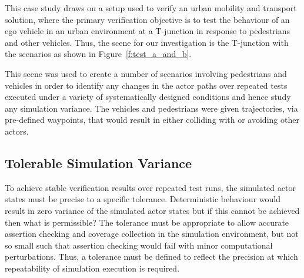\documentclass[letterpaper, 10 pt, journal, twoside]{IEEEtran}
\begin{document}
This case study draws on a setup used to verify an urban mobility and transport solution, where the primary verification objective is to test the behaviour of an ego vehicle in an urban environment at a T-junction in response to pedestrians and other vehicles.
%
Thus, the scene for our investigation is the T-junction with the scenarios as shown in Figure~\ref{f:test_a_and_b}.

This scene was used to create a number of scenarios involving pedestrians and vehicles in order to identify any changes in the actor paths over repeated tests executed under a variety of systematically designed conditions and hence study any simulation variance.
%
The vehicles and pedestrians were given trajectories, via pre-defined waypoints, that would result in either colliding with or avoiding other actors.





\subsection{Tolerable Simulation Variance}\label{s:tolerance}



To achieve stable verification results over repeated test runs, the simulated actor states must be precise to a specific tolerance.
%
Deterministic behaviour would result in zero variance of the simulated actor states but if this cannot be achieved then what is permissible?
%
%
The tolerance must be appropriate to allow accurate assertion checking and coverage collection in the simulation environment, but not so small such that assertion checking would fail with minor computational perturbations. 
%
Thus, a tolerance must be defined to reflect the precision at which repeatability of simulation execution is required. 
\end{document}
